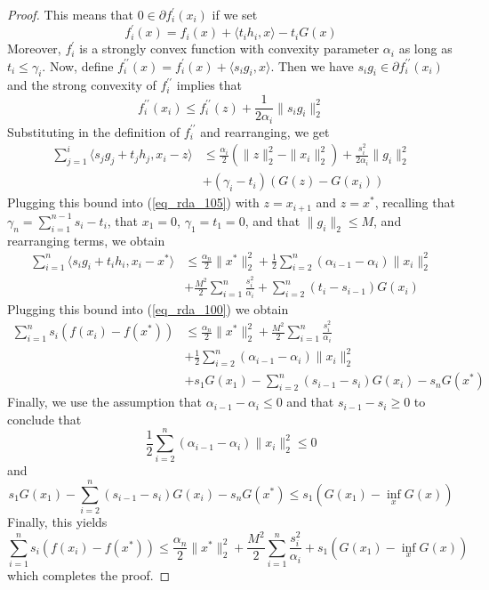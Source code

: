\begin{proof}
 This means that $0\in \partial f_i^\prime(x_i)$ if we set 
 $$f_i^\prime(x) = f_i(x) + \langle t_ih_i, x\rangle - t_iG(x)
 $$
 Moreover, $f_i^\prime$ is a strongly convex function with convexity parameter $\alpha_i$ as long as $t_i\leq \gamma_i$.
 Now, define $f^{\prime\prime}_i(x) = f_i^\prime(x) + \langle s_ig_i, x\rangle$. Then we have
 $s_ig_i\in \partial f^{\prime\prime}_i(x_i)$ and the strong convexity of $f^{\prime\prime}_i$ implies that
 \begin{equation}
  f^{\prime\prime}_i(x_i) \leq f^{\prime\prime}_i(z) + \frac{1}{2\alpha_i}\|s_ig_i\|_2^2
 \end{equation}
 Substituting in the definition of $f^{\prime\prime}_i$ and rearranging, we get
 \begin{align}
  \sum_{j = 1}^i\langle s_jg_j + t_jh_j, x_i - z\rangle &\leq \frac{\alpha_i}{2}(\|z\|_2^2 - \|x_i\|_2^2) + \frac{s_i^2}{2\alpha_i}\|g_i\|_2^2 \\
  &+ (\gamma_i - t_i)(G(z) - G(x_i))
 \end{align}
 Plugging this bound into (\ref{eq_rda_105}) with $z = x_{i+1}$ and $z = x^*$, recalling that 
 $\gamma_n = \sum_{i = 1}^{n-1} s_i - t_i$, that $x_1 = 0$, $\gamma_1 = t_1 = 0$, and that
 $\|g_i\|_2\leq M$, and rearranging terms, we obtain
 \begin{align}
  \displaystyle\sum_{i = 1}^n \langle s_ig_i + t_ih_i, x_i - x^*\rangle& \leq \frac{\alpha_n}{2}\|x^*\|_2^2 
  + \frac{1}{2}\displaystyle\sum_{i = 2}^n (\alpha_{i-1} - \alpha_i)\|x_i\|_2^2 \\
  &+ \frac{M^2}{2}\displaystyle\sum_{i = 1}^n \frac{s_i^2}{\alpha_i}
  + \displaystyle\sum_{i = 2}^n (t_i - s_{i-1})G(x_i)
 \end{align}
 Plugging this bound into (\ref{eq_rda_100}) we obtain
 \begin{align}
  \displaystyle\sum_{i = 1}^n s_i(f(x_i) - f(x^*)) &\leq \frac{\alpha_n}{2}\|x^*\|_2^2 
  + \frac{M^2}{2}\displaystyle\sum_{i = 1}^n \frac{s_i^2}{\alpha_i} \\
  &+ \frac{1}{2}\displaystyle\sum_{i = 2}^n (\alpha_{i-1} - \alpha_i)\|x_i\|_2^2 \\
  &+ s_1 G(x_1) - \displaystyle\sum_{i = 2}^n (s_{i-1} - s_i)G(x_i) - s_nG(x^*)
 \end{align}
 Finally, we use the assumption that $\alpha_{i-1} - \alpha_i \leq 0$ and that $s_{i-1} - s_i \geq 0$ to conclude that
 $$\frac{1}{2}\displaystyle\sum_{i = 2}^n (\alpha_{i-1} - \alpha_i)\|x_i\|_2^2 \leq 0
 $$
 and
 $$s_1 G(x_1) - \displaystyle\sum_{i = 2}^n (s_{i-1} - s_i)G(x_i) - s_nG(x^*) \leq s_1(G(x_1) - \inf_x G(x))
 $$
 Finally, this yields
 \begin{equation}
  \displaystyle\sum_{i = 1}^n s_i(f(x_i) - f(x^*)) \leq \frac{\alpha_n}{2}\|x^*\|_2^2 
  + \frac{M^2}{2}\displaystyle\sum_{i = 1}^n \frac{s_i^2}{\alpha_i}
  + s_1(G(x_1) - \inf_x G(x))
 \end{equation}
 which completes the proof.

\end{proof}


